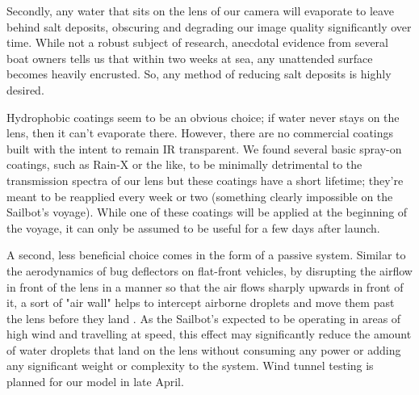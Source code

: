 Secondly, any water that sits on the lens of our camera will evaporate to leave behind salt deposits, obscuring and degrading our image quality significantly over time. While not a robust subject of research, anecdotal evidence from several boat owners tells us that within two weeks at sea, any unattended surface becomes heavily encrusted. So, any method of reducing salt deposits is highly desired. 

Hydrophobic coatings seem to be an obvious choice; if water never stays on the lens, then it can't evaporate there. However, there are no commercial coatings built with the intent to remain IR transparent. We found several basic spray-on coatings, such as Rain-X or the like, to be minimally detrimental to the transmission spectra of our lens but these coatings have a short lifetime; they're meant to be reapplied every week or two (something clearly impossible on the Sailbot's voyage). While one of these coatings will be applied at the beginning of the voyage, it can only be assumed to be useful for a few days after launch.

A second, less beneficial choice comes in the form of a passive system. Similar to the aerodynamics of bug deflectors on flat-front vehicles, by disrupting the airflow in front of the lens in a manner so that the air flows sharply upwards in front of it, a sort of "air wall" helps to intercept airborne droplets and move them past the lens before they land \cite{bug-deflector}. As the Sailbot's expected to be operating in areas of high wind and travelling at speed, this effect may significantly reduce the amount of water droplets that land on the lens without consuming any power or adding any significant weight or complexity to the system. Wind tunnel testing is planned for our model in late April.
